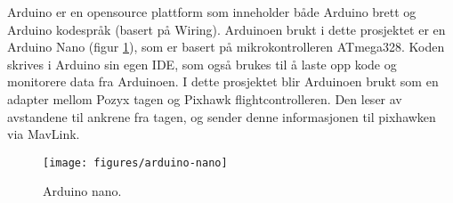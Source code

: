 Arduino er en opensource plattform som inneholder både Arduino brett og Arduino kodespråk (basert på Wiring). 
Arduinoen brukt i dette prosjektet er en Arduino Nano (figur \ref{fig:arduino-nano}), som er basert på mikrokontrolleren ATmega328. 
Koden skrives i Arduino sin egen IDE, som også brukes til å laste opp kode og monitorere data fra Arduinoen. \parencite{ArduinoNano} 
I dette prosjektet blir Arduinoen brukt som en adapter mellom Pozyx tagen og Pixhawk flightcontrolleren. 
Den leser av avstandene til ankrene fra tagen, og sender denne informasjonen til pixhawken via MavLink.

\begin{figure}[htp]
    \centering
    \texttt{[image: figures/arduino-nano]}
    \caption{Arduino nano.\parencite{ArduinoIntroduction}}
    \label{fig:arduino-nano}
\end{figure}
    